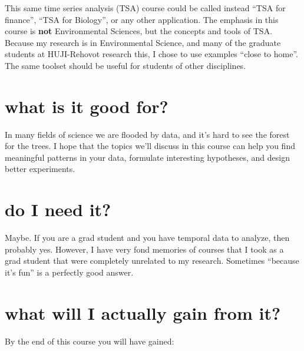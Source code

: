 \documentclass[
  letterpaper,
  DIV=11,
  numbers=noendperiod,
  oneside]{scrreprt}
\begin{document}

This same time series analysis (TSA) course could be called instead
``TSA for finance'', ``TSA for Biology'', or any other application. The
emphasis in this course is \textbf{not} Environmental Sciences, but the
concepts and tools of TSA. Because my research is in Environmental
Science, and many of the graduate students at HUJI-Rehovot research
this, I chose to use examples ``close to home''. The same toolset should
be useful for students of other disciplines.

\hypertarget{what-is-it-good-for}{%
\section*{what is it good for?}\label{what-is-it-good-for}}


In many fields of science we are flooded by data, and it's hard to see
the forest for the trees. I hope that the topics we'll discuss in this
course can help you find meaningful patterns in your data, formulate
interesting hypotheses, and design better experiments.

\hypertarget{do-i-need-it}{%
\section*{do I need it?}\label{do-i-need-it}}


Maybe. If you are a grad student and you have temporal data to analyze,
then probably yes. However, I have very fond memories of courses that I
took as a grad student that were completely unrelated to my research.
Sometimes ``because it's fun'' is a perfectly good answer.

\hypertarget{what-will-i-actually-gain-from-it}{%
\section*{\texorpdfstring{what will I \textbf{actually} gain from
it?}{what will I actually gain from it?}}\label{what-will-i-actually-gain-from-it}}


By the end of this course you will have gained:
\end{document}
